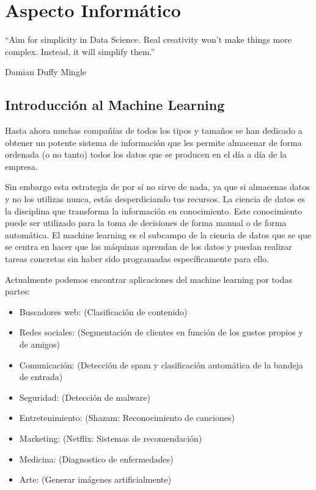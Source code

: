 \lstset{language=Python} 

\chapter{Aspecto Informático}

\epigraph{“Aim for simplicity in Data Science. Real creativity won’t make things more complex. Instead, it will simplify them.”}{Damian Duffy Mingle}



\section{Introducción al Machine Learning}

Hasta ahora muchas compañías de todos los tipos y tamaños se han dedicado a obtener un potente sistema de información que les permite almacenar de forma ordenada (o no tanto) todos los datos que se producen en el día a día de la empresa.  

Sin embargo esta estrategia de por sí no sirve de nada, ya que si almacenas datos y no los utilizas nunca, estás desperdiciando tus recursos.  
La ciencia de datos es la disciplina que transforma la información en conocimiento.  
Este conocimiento puede ser utilizado para la toma de decisiones de forma manual o de forma automática.  
El machine learning es el subcampo de la ciencia de datos que se que se centra en hacer que las máquinas aprendan de los datos y puedan realizar 
tareas concretas sin haber sido programadas específicamente para ello.

Actualmente podemos encontrar aplicaciones del machine learning por todas partes:

\begin{itemize}
\item Buscadores web: (Clasificación de contenido)
\item Redes sociales: (Segmentación de clientes en función de los gustos propios y de amigos)
\item Comunicación: (Detección de spam y clasificación automática de la bandeja de entrada)
\item Seguridad: (Detección de malware)
\item Entretenimiento: (Shazam: Reconocimiento de canciones)
\item Marketing: (Netflix: Sistemas de recomendación)
\item Medicina: (Diagnostico de enfermedades)
\item Arte: (Generar imágenes artificialmente) 
\end{itemize}

